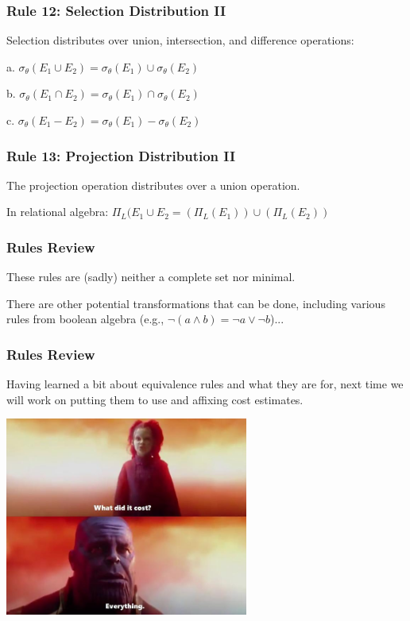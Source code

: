 \begin{frame}
\frametitle{Rule 12: Selection Distribution II}

Selection distributes over union, intersection, and difference operations:

a. $\sigma_{\theta}(E_{1} \cup E_{2}) = \sigma_{\theta}(E_{1}) \cup \sigma_{\theta}(E_{2})$

b. $\sigma_{\theta}(E_{1} \cap E_{2}) = \sigma_{\theta}(E_{1}) \cap \sigma_{\theta}(E_{2})$

c. $\sigma_{\theta}(E_{1} - E_{2}) = \sigma_{\theta}(E_{1}) - \sigma_{\theta}(E_{2})$



\end{frame}

\begin{frame}
\frametitle{Rule 13: Projection Distribution II }

The projection operation distributes over a union operation.

In relational algebra: $\Pi_{L}(E_{1} \cup E_{2} = (\Pi_{L}(E_{1}))\cup(\Pi_{L}(E_{2}))$



\end{frame}


\begin{frame}
\frametitle{Rules Review}


These rules are (sadly) neither a complete set nor minimal. 

There are other potential transformations that can be done, including various rules from boolean algebra (e.g., $\neg (a \wedge b) = \neg a \vee \neg b$)...


\end{frame}


\begin{frame}
\frametitle{Rules Review}


Having learned a bit about equivalence rules and what they are for, next time we will work on putting them to use and affixing cost estimates.

\begin{center}
	\includegraphics[width=0.6\textwidth]{images/cost-estimates.jpg}
\end{center}

\end{frame}








